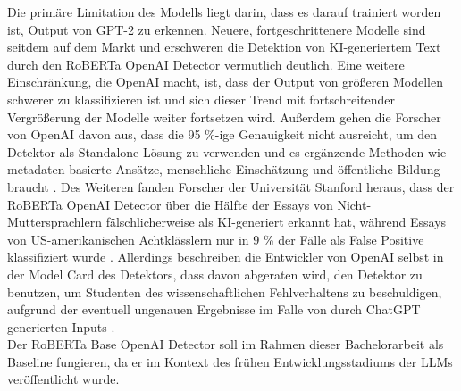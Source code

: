 Die primäre Limitation des Modells liegt darin, dass es darauf trainiert worden ist, Output von GPT-2 zu erkennen. Neuere, fortgeschrittenere Modelle sind seitdem auf dem Markt und erschweren die Detektion von KI-generiertem Text durch den RoBERTa OpenAI Detector vermutlich deutlich. Eine weitere Einschränkung, die OpenAI macht, ist, dass der Output von größeren Modellen schwerer zu klassifizieren ist und sich dieser Trend mit fortschreitender Vergrößerung der Modelle weiter fortsetzen wird. Außerdem gehen die Forscher von OpenAI davon aus, dass die 95 \%-ige Genauigkeit nicht ausreicht, um den Detektor als Standalone-Lösung zu verwenden und es ergänzende Methoden wie metadaten-basierte Ansätze, menschliche Einschätzung und öffentliche Bildung braucht \autocite{openai2019}. Des Weiteren fanden Forscher der Universität Stanford heraus, dass der RoBERTa OpenAI Detector über die Hälfte der Essays von Nicht-Muttersprachlern fälschlicherweise als KI-generiert erkannt hat, während Essays von US-amerikanischen Achtklässlern nur in 9 \% der Fälle als False Positive klassifiziert wurde \autocite{liang2023gptdetectorsbiasednonnative}. Allerdings beschreiben die Entwickler von OpenAI selbst in der Model Card des Detektors, dass davon abgeraten wird, den Detektor zu benutzen, um Studenten des wissenschaftlichen Fehlverhaltens zu beschuldigen, aufgrund der eventuell ungenauen Ergebnisse im Falle von durch ChatGPT generierten Inputs \autocite{modelcardRoBERTaDetector}.  \\
Der RoBERTa Base OpenAI Detector soll im Rahmen dieser Bachelorarbeit als Baseline fungieren, da er im Kontext des frühen Entwicklungsstadiums der LLMs veröffentlicht wurde.

